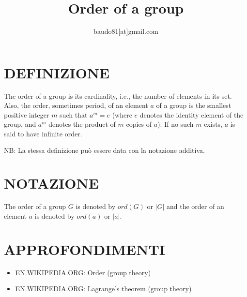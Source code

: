 \documentclass[a4paper,10pt]{article}
\title{Order of a group}
\author{baudo81[at]gmail.com}
\begin{document}
\maketitle

\section{DEFINIZIONE}
The order of a group is its cardinality, i.e., the number of elements in its set. Also, the order, sometimes period, of an element
$a$ of a group is the smallest positive integer $m$ such that $a^m=e$ (where $e$ denotes the identity element of the group, and $a^m$
denotes the product of $m$ copies of $a$). If no such $m$ exists, $a$ is said to have infinite order.

NB: La stessa definizione può essere data con la notazione additiva.

\section{NOTAZIONE}
The order of a group $G$ is denoted by $ord(G)$ or $|G|$ and the order of an element $a$ is denoted by $ord(a)$ or $|a|$. 

\section{APPROFONDIMENTI}
\begin{itemize}
 \item EN.WIKIPEDIA.ORG: Order (group theory) \cite{orderofgroup1}
 \item EN.WIKIPEDIA.ORG: Lagrange's theorem (group theory) \cite{orderofgroup2}
\end{itemize}




\end{document}

